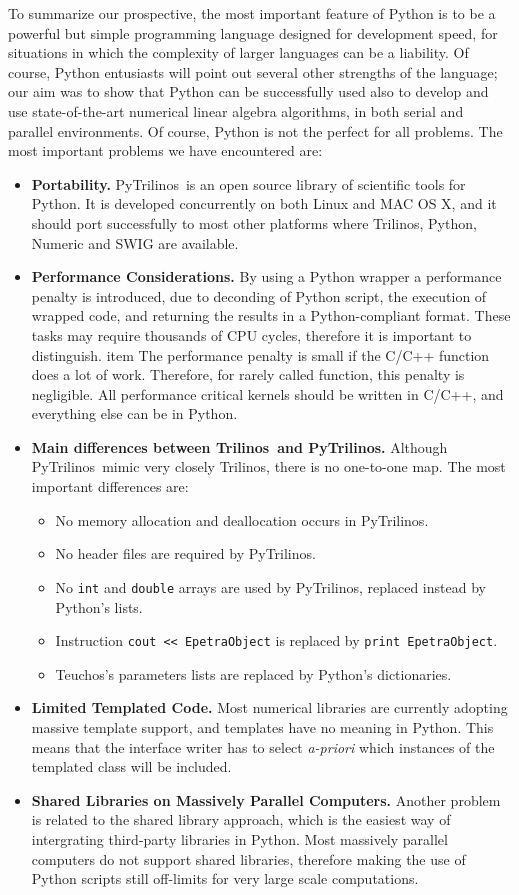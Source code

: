 \documentclass[10pt,relax]{SANDreport}
\newcommand{\PyTrilinos}{{PyTrilinos}}
\newcommand{\trilinos}{{Trilinos}}
\newcommand{\teuchos}{{Teuchos}}
\begin{document}
\smallskip

To summarize our prospective, the most important feature of Python is to be a
powerful but simple programming language designed for development speed, for
situations in which the complexity of larger languages can be a liability. Of
course, Python entusiasts will point out several other strengths of the
language; our aim was to show that Python can be successfully used also to
develop and use state-of-the-art numerical linear algebra algorithms, in both
serial and parallel environments.  Of course, Python is not the perfect for
all problems. The most important problems we have encountered are:
\begin{itemize}
\item {\bf Portability.} \PyTrilinos\ is an open source library of scientific
  tools for Python.  It is developed concurrently on both Linux and MAC OS X,
  and it should port successfully to most other platforms where Trilinos,
  Python, Numeric and SWIG are available.
%
\item {\bf Performance Considerations.}
By using a Python wrapper a performance penalty is introduced, due to
deconding of Python script, the execution of wrapped code, and returning the
results in a Python-compliant format. These tasks may require thousands of CPU
cycles, therefore it is important to distinguish.
item The performance penalty is small if the C/C++ function does a lot of work.
Therefore, for rarely called function, this penalty is negligible.
All performance critical kernels should be written in C/C++, and
everything else can be in Python.
%
\item {\bf Main differences between \trilinos\ and \PyTrilinos.}
Although \PyTrilinos\ mimic very closely \trilinos, there is no one-to-one
map. The most important differences are:
\begin{itemize}
\item No memory allocation and deallocation occurs in \PyTrilinos.
\item No header files are required by \PyTrilinos.
\item No {\tt int} and {\tt double} arrays are used by \PyTrilinos, replaced instead by
Python's lists.
\item Instruction \verb!cout << EpetraObject! is replaced by \verb!print EpetraObject!.
\item \teuchos's parameters lists are replaced by Python's dictionaries.
\end{itemize}
\item {\bf Limited Templated Code.} Most numerical
libraries are currently adopting massive template support, and templates have
no meaning in Python. This means that the interface writer has to select {\sl
  a-priori} which instances of the templated class will be included.
\item {\bf Shared Libraries on Massively Parallel Computers.} Another problem
is related to the shared library approach, which is the easiest way of
intergrating third-party libraries in Python. Most massively parallel
computers do not support shared libraries, therefore making the use of Python
scripts still off-limits for very large scale computations.
\end{itemize}
\end{document}
